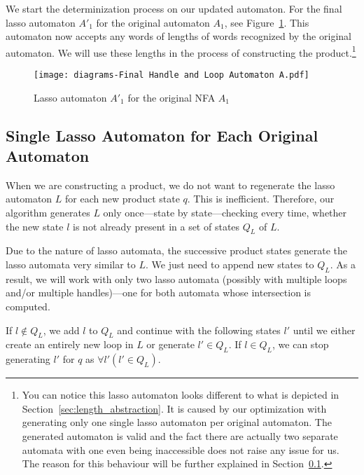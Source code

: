 We start the determinization process on our updated automaton. For the final lasso automaton $A'_1$ for the original automaton $A_1$, see Figure~\ref{fig:HaL_A1}. This automaton now accepts any words of lengths of words recognized by the original automaton. We will use these lengths in the process of constructing the product.\footnote{You can notice this lasso automaton looks different to what is depicted in Section~\ref{sec:length_abstraction}. It is caused by our optimization with generating only one single lasso automaton per original automaton. The generated automaton is valid and the fact there are actually two separate automata with one even being inaccessible does not raise any issue for us. The reason for this behaviour will be further explained in Section~\ref{sec:singleHaL}.}

 \begin{figure}[ht]
	\centering
	\texttt{[image: diagrams-Final Handle and Loop Automaton A.pdf]}
	\caption{Lasso automaton $A'_1$ for the original NFA $A_1$}
	\label{fig:HaL_A1}
\end{figure}



\subsection{Single Lasso Automaton for Each Original Automaton}\label{sec:singleHaL}

When we are constructing a product, we do not want to regenerate the lasso  automaton $L$ for each new product state $q$. This is inefficient. Therefore, our algorithm generates $L$ only once---state by state---checking every time, whether the new state $l$ is not already present in a set of states $Q_L$ of $L$.

Due to the nature of lasso automata, the successive product states generate the lasso automata very similar to $L$. We just need to append new states to $Q_L$. As a result, we will work with only two lasso automata (possibly with multiple loops and/or multiple handles)---one for both automata whose intersection is computed.

If $l \notin Q_L$, we add $l$ to $Q_L$ and continue with the following states $l'$ until we either create an entirely new loop in $L$ or generate $l' \in Q_L$. If $l \in Q_L$, we can stop generating $l'$ for $q$ as $\forall l' ( l' \in Q_L)$.

